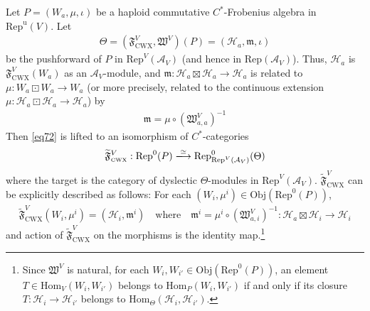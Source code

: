 \documentclass[11pt,b5paper,notitlepage]{article}
\theoremstyle{definition}
\theoremstyle{plain}
\newcommand{\fk}{\mathfrak}
\newcommand{\mc}{\mathcal}
\newcommand{\Hom}{\mathrm{Hom}}
\newcommand{\Rep}{\mathrm{Rep}}
\newcommand{\uni}{\mathrm{u}}
\newcommand{\RepV}{{\mathrm{Rep}^\uni(V)}}
\newcommand{\Obj}{\mathrm{Obj}}
\newcommand{\mk}{\mathfrak m}
\newcommand{\FVCWX}{{\mathfrak F^V_{\scriptscriptstyle \mathrm{CWX}}}}
\newcommand{\tFVCWX}{{\widetilde{\mathfrak F}^V_{\scriptscriptstyle \mathrm{CWX}}}}
\numberwithin{equation}{section}
\begin{document}
Let $P=(W_a,\mu,\iota)$ be a haploid commutative $C^*$-Frobenius algebra in $\RepV$. Let
\begin{align*}
\Theta=(\FVCWX,\fk W^V)(P)=(\mc H_a,\fk m,\iota)
\end{align*}
be the pushforward of $P$ in $\Rep^V(\mc A_V)$ (and hence in $\Rep(\mc A_V)$). Thus,  $\mc H_a$ is $\FVCWX(W_a)$ as an $\mc A_V$-module, and $\mk:\mc H_a\boxtimes\mc H_a\rightarrow\mc H_a$ is related to $\mu:W_a\boxdot W_a\rightarrow W_a$ (or more precisely, related to the continuous extension $\mu:\mc H_a\boxdot\mc H_a\rightarrow\mc H_a$) by
\begin{align}\label{eq106}
\mk=\mu\circ(\fk W^V_{a,a})^{-1}
\end{align}
Then \eqref{eq72} is lifted to an isomorphism of $C^*$-categories
\begin{align*}
\tFVCWX:\Rep^0(P)\xlongrightarrow{\simeq}\Rep^0_{\Rep^V(\mc A_V)}(\Theta)
\end{align*}
where the target is the category of dyslectic $\Theta$-modules in $\Rep^V(\mc A_V)$. $\tFVCWX$ can be explicitly described as follows: For each $(W_i,\mu^i)\in\Obj(\Rep^0(P))$, 
\begin{align}\label{eq80}
\tFVCWX(W_i,\mu^i)=(\mc H_i,\mk^i)\quad\text{where}\quad\mk^i=\mu^i\circ(\fk W_{a,i}^V)^{-1}:\mc H_a\boxtimes\mc H_i\rightarrow\mc H_i
\end{align}
and action of $\tFVCWX$ on the morphisms is the identity map.\footnote{Since $\fk W^V$ is natural, for each $W_i,W_{i'}\in\Obj(\Rep^0(P))$, an element $T\in\Hom_V(W_i,W_{i'})$ belongs to $\Hom_P(W_i,W_{i'})$ if and only if its closure $T:\mc H_i\rightarrow\mc H_{i'}$ belongs to $\Hom_\Theta(\mc H_i,\mc H_{i'})$.} 
\end{document}

